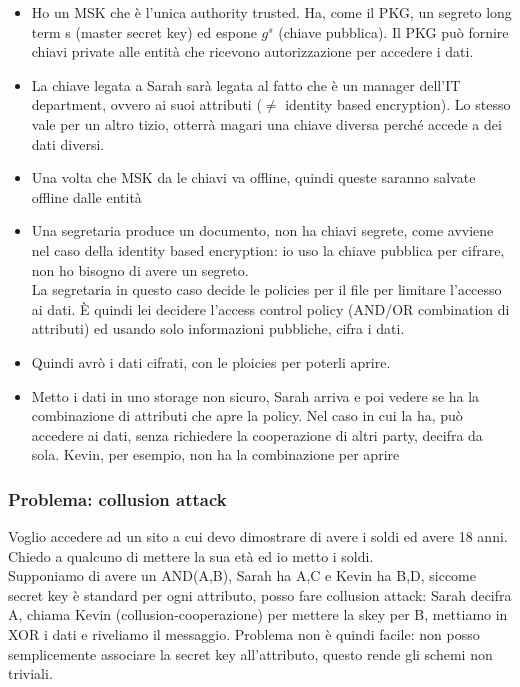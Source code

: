 \documentclass[16px]{article}
\begin{document}
\begin{itemize}
\item Ho un MSK che è l'unica authority trusted. Ha, come il PKG, un segreto long term s (master secret key) ed espone $g^s$ (chiave pubblica). Il PKG può fornire chiavi private alle entità che ricevono autorizzazione per accedere i dati.
\item La chiave legata a Sarah sarà legata al fatto che è un manager dell'IT department, ovvero ai suoi attributi ($\neq$ identity based encryption). Lo stesso vale per un altro tizio, otterrà magari una chiave diversa perché accede a dei dati diversi.
\item Una volta che MSK da le chiavi va offline, quindi queste saranno salvate offline dalle entità
\item Una segretaria produce un documento, non ha chiavi segrete, come avviene nel caso della identity based encryption: io uso la chiave pubblica per cifrare, non ho bisogno di avere un segreto.\\ La segretaria in questo caso decide le policies per il file per limitare l'accesso ai dati. È quindi lei decidere l'access control policy (AND/OR combination di attributi) ed usando solo informazioni pubbliche, cifra i dati.
\item Quindi avrò i dati cifrati, con le ploicies per poterli aprire.
\item Metto i dati in uno storage non sicuro, Sarah arriva e poi vedere se ha la combinazione di attributi che apre la policy. Nel caso in cui la ha, può accedere ai dati, senza richiedere la cooperazione di altri party, decifra da sola. Kevin, per esempio, non ha la combinazione per aprire
\end{itemize}
\subsubsection{Problema: collusion attack}
Voglio accedere ad un sito a cui devo dimostrare di avere i soldi ed avere 18 anni. Chiedo a qualcuno di mettere la sua età ed io metto i soldi.\\ Supponiamo di avere un AND(A,B), Sarah ha A,C e Kevin ha B,D, siccome secret key è standard per ogni attributo, posso fare collusion attack: Sarah decifra A, chiama Kevin (collusion-cooperazione) per mettere la skey per B, mettiamo in XOR i dati e riveliamo il messaggio. Problema non è quindi facile: non posso semplicemente associare la secret key all'attributo, questo rende gli schemi non triviali.
\end{document}
